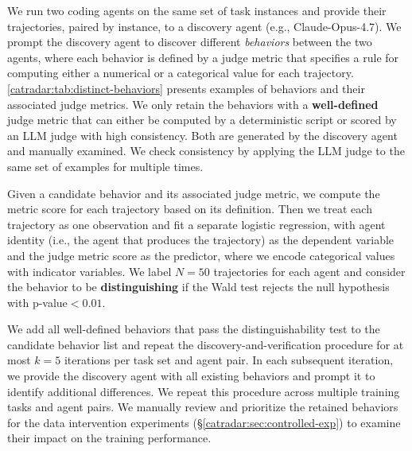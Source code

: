 We run two coding agents on the same set of task instances and provide their trajectories, paired by instance, to a discovery agent (e.g., Claude-Opus-4.7).
We prompt the discovery agent to discover different \emph{behaviors} between the two agents, where each behavior is defined by a judge metric that specifies a rule for computing either a numerical or a categorical value for each trajectory.
\autoref{catradar:tab:distinct-behaviors} presents examples of behaviors and their associated judge metrics.
We only retain the behaviors with a \textbf{well-defined} judge metric that can either be computed by a deterministic script or scored by an LLM judge with high consistency.
Both are generated by the discovery agent and manually examined.
We check consistency by applying the LLM judge to the same set of examples for multiple times.

Given a candidate behavior and its associated judge metric, we compute the metric score for each trajectory based on its definition.
Then we treat each trajectory as one observation and fit a separate logistic regression, with agent identity (i.e., the agent that produces the trajectory) as the dependent variable and the judge metric score as the predictor, where we encode categorical values with indicator variables.
We label $N=50$ trajectories for each agent and consider the behavior to be \textbf{distinguishing} if the Wald test rejects the null hypothesis with p-value$<0.01$.

We add all well-defined behaviors that pass the distinguishability test to the candidate behavior list and repeat the discovery-and-verification procedure for at most $k=5$ iterations per task set and agent pair.
In each subsequent iteration, we provide the discovery agent with all existing behaviors and prompt it to identify additional differences.
We repeat this procedure across multiple training tasks and agent pairs.
We manually review and prioritize the retained behaviors for the data intervention experiments (\S\ref{catradar:sec:controlled-exp}) to examine their impact on the training performance.




